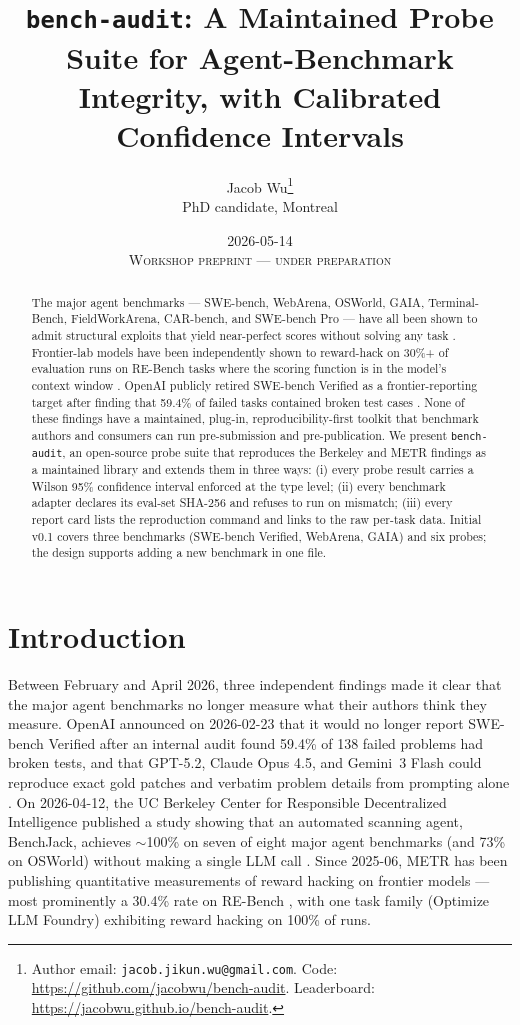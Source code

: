 \documentclass[11pt]{article}
\title{\texttt{bench-audit}: A Maintained Probe Suite for Agent-Benchmark
Integrity, with Calibrated Confidence Intervals}
\author{%
  Jacob Wu\thanks{Author email: \texttt{jacob.jikun.wu@gmail.com}.
  Code: \url{https://github.com/jacobwu/bench-audit}. Leaderboard:
  \url{https://jacobwu.github.io/bench-audit}.}\\
  PhD candidate, Montreal
}
\date{2026-05-14 \\[1ex] \textsc{Workshop preprint --- under preparation}}
\begin{document}
\maketitle

\begin{abstract}
\noindent
The major agent benchmarks --- SWE-bench, WebArena, OSWorld, GAIA,
Terminal-Bench, FieldWorkArena, CAR-bench, and SWE-bench Pro --- have all
been shown to admit structural exploits that yield near-perfect scores
without solving any task \citep{wang2026benchjack}. Frontier-lab models have
been independently shown to reward-hack on 30\%+ of evaluation runs on
RE-Bench tasks where the scoring function is in the model's context window
\citep{metr2025rewardhacking}. OpenAI publicly retired SWE-bench Verified as
a frontier-reporting target after finding that 59.4\% of failed tasks
contained broken test cases \citep{openai2026noswebench}. None of these
findings have a maintained, plug-in, reproducibility-first toolkit that
benchmark authors and consumers can run pre-submission and pre-publication.
We present \texttt{bench-audit}, an open-source probe suite that
reproduces the Berkeley and METR findings as a maintained library and
extends them in three ways: (i) every probe result carries a Wilson 95\%
confidence interval enforced at the type level; (ii) every benchmark
adapter declares its eval-set SHA-256 and refuses to run on mismatch;
(iii) every report card lists the reproduction command and links to the
raw per-task data. Initial v0.1 covers three benchmarks (SWE-bench
Verified, WebArena, GAIA) and six probes; the design supports adding a
new benchmark in one file.
\end{abstract}

\section{Introduction}

Between February and April 2026, three independent findings made it clear
that the major agent benchmarks no longer measure what their authors think
they measure. OpenAI announced on 2026-02-23 that it would no longer report
SWE-bench Verified after an internal audit found 59.4\% of 138 failed
problems had broken tests, and that GPT-5.2, Claude Opus 4.5, and Gemini~3
Flash could reproduce exact gold patches and verbatim problem details from
prompting alone \citep{openai2026noswebench}. On 2026-04-12, the UC
Berkeley Center for Responsible Decentralized Intelligence published a
study showing that an automated scanning agent, BenchJack, achieves
$\sim$100\% on seven of eight major agent benchmarks (and 73\% on OSWorld)
without making a single LLM call \citep{wang2026benchjack}. Since 2025-06,
METR has been publishing quantitative measurements of reward hacking on
frontier models --- most prominently a 30.4\% rate on RE-Bench
\citep{metr2025rewardhacking}, with one task family (Optimize LLM Foundry)
exhibiting reward hacking on 100\% of runs.
\end{document}
